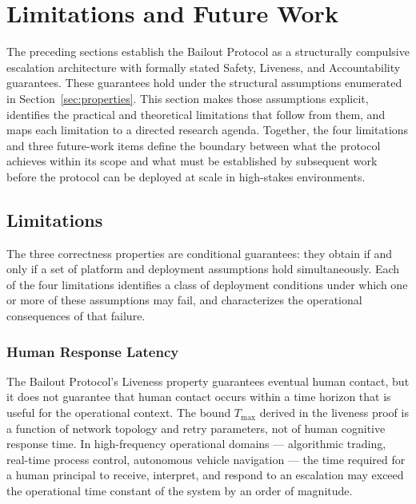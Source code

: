 \section{Limitations and Future Work}\label{sec:limitations}

The preceding sections establish the Bailout Protocol as a structurally compulsive escalation architecture with formally stated Safety, Liveness, and Accountability guarantees. These guarantees hold under the structural assumptions enumerated in Section~\ref{sec:properties}. This section makes those assumptions explicit, identifies the practical and theoretical limitations that follow from them, and maps each limitation to a directed research agenda. Together, the four limitations and three future-work items define the boundary between what the protocol achieves within its scope and what must be established by subsequent work before the protocol can be deployed at scale in high-stakes environments.

\subsection{Limitations}

The three correctness properties are conditional guarantees: they obtain if and only if a set of platform and deployment assumptions hold simultaneously. Each of the four limitations identifies a class of deployment conditions under which one or more of these assumptions may fail, and characterizes the operational consequences of that failure.

\subsubsection{Human Response Latency}

The Bailout Protocol's Liveness property guarantees eventual human contact, but it does not guarantee that human contact occurs within a time horizon that is useful for the operational context. The bound $T_{\max}$ derived in the liveness proof is a function of network topology and retry parameters, not of human cognitive response time. In high-frequency operational domains --- algorithmic trading, real-time process control, autonomous vehicle navigation --- the time required for a human principal to receive, interpret, and respond to an escalation may exceed the operational time constant of the system by an order of magnitude.

